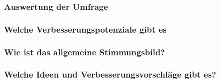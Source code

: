\subsubsection{Auswertung der Umfrage}


\subsubsection{Welche Verbesserungspotenziale gibt es}

\subsubsection{Wie ist das allgemeine Stimmungsbild?}

\subsubsection{Welche Ideen und Verbesserungsvorschläge gibt es?}


\begin{comment}
    Voruntersuchung
    •Finden und Definieren des Problems
    •Ist-Analyse
    •Durchführbarkeits-Untersuchung
    -technisch, wirtschaftlich

    Aufgaben
    •Ist-Situation analysieren
    •Hauptanforderungen zusammenstellen
    •Lösungsvarianten betrachten
    •Empfehlung aussprechen
    •Projektkalkulation erstellen
    •Projektplan vorschlagen

    Ergebnisdokumente
    •Lastenheft und Glossar
    •Projektkalkulation und Projektplan

    Lastenheft (themensammlung)
    Erste schriftliche Abstimmung zwischen Auftraggeber und Auftragnehmer über fachliche Basisanforderungen.
    Notwendig, da Aufträge typischerweise unvollständig und widersprüchlich sowie unterschiedlich interpretierbar sind.
    Wird später zum Pflichtenheft erweitert (daher auch: „grobes Pflichtenheft“)
    Im Englischen „Requirements Specification“ (keine Unterscheidung von Lasten-/Pflichtenheft)
\end{comment}




